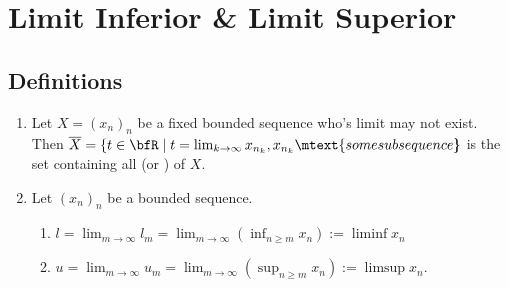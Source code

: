 \chapter*{Limit Inferior \& Limit Superior}
\vspace{12pt}

\section*{Definitions}
    \begin{enumerate}[label = (\arabic*)]
        \item Let $X = (x_n)_n$ be a fixed bounded sequence who's limit may not exist. Then $\overline{X} = \{t \in \bfR \mid t = \lim_{k \rightarrow \infty} x_{n_k}, x_{n_k} \mtext{some subsequence}\hspace{-5pt}\}$ is the set containing all  (or ) of $X$. 
        
        \item Let $(x_n)_n$ be a bounded sequence.
            \begin{enumerate}[label = (\roman*)]
                \item $l = \lim_{m \rightarrow \infty} l_m = \lim_{m \rightarrow \infty} (\inf_{n \geq m}x_n) := \liminf x_n$
                \item $u = \lim_{m \rightarrow \infty}u_m = \lim_{m \rightarrow \infty}(\sup_{n \geq m}x_n) := \limsup x_n$.
            \end{enumerate}
    \end{enumerate}
